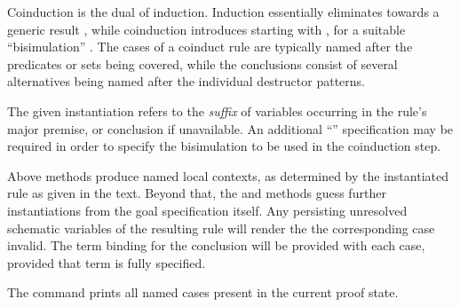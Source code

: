 \begin{isabellebody}
\begin{isamarkuptext}
\begin{description}
  Coinduction is the dual of induction.  Induction essentially
  eliminates  towards a generic result ,
  while coinduction introduces  starting with , for a suitable ``bisimulation'' .  The cases of a
  coinduct rule are typically named after the predicates or sets being
  covered, while the conclusions consist of several alternatives being
  named after the individual destructor patterns.
  
  The given instantiation refers to the \emph{suffix} of variables
  occurring in the rule's major premise, or conclusion if unavailable.
  An additional ``''
  specification may be required in order to specify the bisimulation
  to be used in the coinduction step.

  \end{description}

  Above methods produce named local contexts, as determined by the
  instantiated rule as given in the text.  Beyond that, the \hyperlink{method.induct}{\mbox{}} and \hyperlink{method.coinduct}{\mbox{}} methods guess further instantiations
  from the goal specification itself.  Any persisting unresolved
  schematic variables of the resulting rule will render the the
  corresponding case invalid.  The term binding \hyperlink{variable.?case}{\mbox{}} for
  the conclusion will be provided with each case, provided that term
  is fully specified.

  The \hyperlink{command.print-cases}{\mbox{}} command prints all named cases present
  in the current proof state.


\end{isamarkuptext}
\end{isabellebody}
